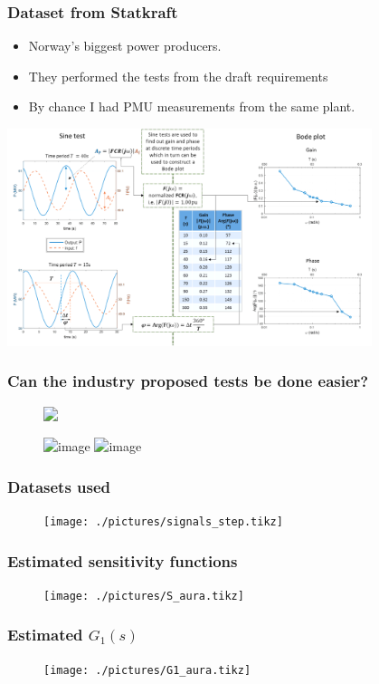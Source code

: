 \begin{frame}
	\frametitle{Dataset from Statkraft}
	\begin{itemize}[<+->]
		\item Norway's biggest power producers.
		\item They performed the tests from the draft requirements
		\item By chance I had PMU measurements from the same plant.
		\end{itemize}
		\includegraphics[width=0.8\textwidth]{./pictures/tests.png}
\end{frame}
\begin{frame}
	\frametitle{Can the industry proposed tests be done easier?}
	\begin{figure}
		\includegraphics<1->[width=0.6\textwidth]{./pictures/aura_signals.tikz}
	\end{figure}
	\begin{figure}
		\includegraphics<1>[width=0.6\textwidth]{./pictures/frd.tikz}
		\includegraphics<2>[width=0.6\textwidth]{./pictures/frd_vs_bj.tikz}
	\end{figure}
\end{frame}
\begin{frame}
	\frametitle{Datasets used}
	\begin{figure}
			\texttt{[image: ./pictures/signals\_step.tikz]}
	\end{figure}
\end{frame}
\begin{frame}
	\frametitle{Estimated sensitivity functions}
		\begin{figure}[tb]
			\texttt{[image: ./pictures/S\_aura.tikz]}
		\end{figure}
\end{frame}
\begin{frame}
	\frametitle{Estimated $G_1(s)$}
		\begin{figure}[tb]
			\texttt{[image: ./pictures/G1\_aura.tikz]}
		\end{figure}
\end{frame}
